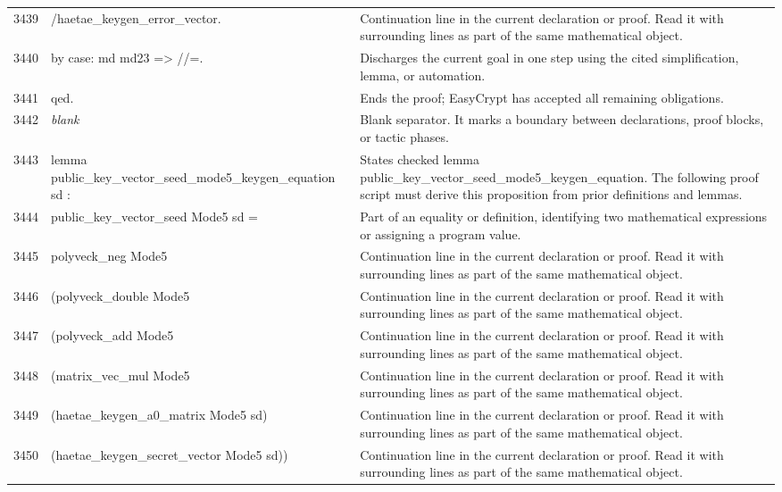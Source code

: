 \documentclass[10pt]{article}
\begin{document}
\begin{longtable}{r L{0.53\textwidth} L{0.37\textwidth}}
3439 & {\ttfamily\scriptsize         /haetae\_keygen\_error\_vector.} & Continuation line in the current declaration or proof.  Read it with surrounding lines as part of the same mathematical object. \\
3440 & {\ttfamily\scriptsize by case: md md23 => //=.} & Discharges the current goal in one step using the cited simplification, lemma, or automation. \\
3441 & {\ttfamily\scriptsize qed.} & Ends the proof; EasyCrypt has accepted all remaining obligations. \\
3442 & {\ttfamily\scriptsize \emph{blank}} & Blank separator.  It marks a boundary between declarations, proof blocks, or tactic phases. \\
3443 & {\ttfamily\scriptsize lemma public\_key\_vector\_seed\_mode5\_keygen\_equation sd :} & States checked lemma public\_key\_vector\_seed\_mode5\_keygen\_equation.  The following proof script must derive this proposition from prior definitions and lemmas. \\
3444 & {\ttfamily\scriptsize   public\_key\_vector\_seed Mode5 sd =} & Part of an equality or definition, identifying two mathematical expressions or assigning a program value. \\
3445 & {\ttfamily\scriptsize   polyveck\_neg Mode5} & Continuation line in the current declaration or proof.  Read it with surrounding lines as part of the same mathematical object. \\
3446 & {\ttfamily\scriptsize     (polyveck\_double Mode5} & Continuation line in the current declaration or proof.  Read it with surrounding lines as part of the same mathematical object. \\
3447 & {\ttfamily\scriptsize       (polyveck\_add Mode5} & Continuation line in the current declaration or proof.  Read it with surrounding lines as part of the same mathematical object. \\
3448 & {\ttfamily\scriptsize         (matrix\_vec\_mul Mode5} & Continuation line in the current declaration or proof.  Read it with surrounding lines as part of the same mathematical object. \\
3449 & {\ttfamily\scriptsize           (haetae\_keygen\_a0\_matrix Mode5 sd)} & Continuation line in the current declaration or proof.  Read it with surrounding lines as part of the same mathematical object. \\
3450 & {\ttfamily\scriptsize           (haetae\_keygen\_secret\_vector Mode5 sd))} & Continuation line in the current declaration or proof.  Read it with surrounding lines as part of the same mathematical object. \\

\end{longtable}
\end{document}
